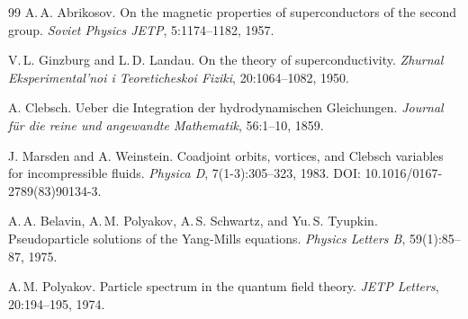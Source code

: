 \documentclass[11pt,a4paper]{article}
\begin{document}
\begin{thebibliography}{99}
		A.\,A. Abrikosov.
		\newblock On the magnetic properties of superconductors of the second group.
		\newblock \textit{Soviet Physics JETP}, 5:1174--1182, 1957.
		
		V.\,L. Ginzburg and L.\,D. Landau.
		\newblock On the theory of superconductivity.
		\newblock \textit{Zhurnal Eksperimental'noi i Teoreticheskoi Fiziki}, 20:1064--1082, 1950.
		
		A. Clebsch.
		\newblock Ueber die Integration der hydrodynamischen Gleichungen.
		\newblock \textit{Journal für die reine und angewandte Mathematik}, 56:1--10, 1859.
		
		J. Marsden and A. Weinstein.
		\newblock Coadjoint orbits, vortices, and Clebsch variables for incompressible fluids.
		\newblock \textit{Physica D}, 7(1-3):305--323, 1983.
		\newblock DOI: 10.1016/0167-2789(83)90134-3.
		
		A.\,A. Belavin, A.\,M. Polyakov, A.\,S. Schwartz, and Yu.\,S. Tyupkin.
		\newblock Pseudoparticle solutions of the Yang-Mills equations.
		\newblock \textit{Physics Letters B}, 59(1):85--87, 1975.
		
		A.\,M. Polyakov.
		\newblock Particle spectrum in the quantum field theory.
		\newblock \textit{JETP Letters}, 20:194--195, 1974.
		
	\end{thebibliography}
	
\end{document}
